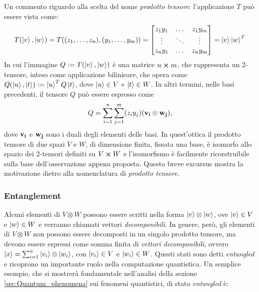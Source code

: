 Un commento riguardo alla scelta del nome \textit{prodotto tensore}: l'applicazione $T$ può essere vista come:
\begin{align*}
 T(\ket{v},\ket{w}) = T((z_1,\dots,z_n), (y_1, \dots, y_m)) = 
 \begin{bmatrix}
      z_1y_1    & \dots     & z_1y_m    \\
      \vdots    & \ddots    & \vdots    \\
      z_ny_1    & \dots     & z_ny_m    \\
 \end{bmatrix}
 = \ket{v}\ket{w}^{T}
\end{align*}
In cui l'immagine $Q := T(\ket{v},\ket{w})$ è una matrice $n \cross m$, che rappresenta un 2-tensore, inteso come applicazione bilinieare, che opera come $Q(\ket{u},\ket{t}) := \ket{u}^{T}Q\ket{t}$, dove $\ket{u} \in V$ e $\ket{t} \in W$. In altri termini, nelle basi precedenti, il tensore $Q$ può essere espresso come
\begin{align*}
Q = \sum_{i=1}^n \sum_{j=1}^m (z_i y_j)(\bf{v_i} \otimes \bf{w_j}),
\end{align*}
dove $\bf{v_i}$ e $\bf{w_j}$ sono i duali degli elementi delle basi. In quest'ottica il prodotto tensore di due spazi $V$ e $W$, di dimensione finita, fissata una base, è isomorfo allo spazio dei 2-tensori definiti su $V \cross W$ e l'isomorfismo è facilmente ricorstruibile sulla base dell'osservazione appena proposta. Questo breve excursus mostra la motivazione dietro alla nomenclatura di \textit{prodotto tensore}.

\subsubsection{Entanglement}\label{sec:entanglement}
Alcuni elementi di $V \otimes W$ possono essere scritti nella forma $\ket{v} \otimes \ket{w}$, ove $\ket{v} \in V$ e $\ket{w} \in W$ e verranno chiamati vettori \textit{decomponibili}.
In genere, però, gli elementi di $V \otimes W$ non possono essere decomposti in un singolo prodotto tensore, ma devono essere espressi come somma finita di \textit{vettori decomponibili}, ovvero ${\ket{x} = \sum_{i=1}^n \ket{v_i} \otimes \ket{w_i}}$, con $\ket{v_i} \in V$ e $\ket{w_i} \in W$.
Questi stati sono detti \textit{entangled} e ricoprono un importante ruolo nella computazione quantistica.
Un semplice esempio, che si mostrerà fondamentale nell'analisi della sezione \ref{sec:Quantum_phenomena} sui fenomeni quantistici, di stato \textit{entangled} è:

